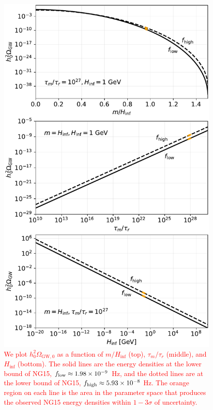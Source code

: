 \documentclass[prd,twocolumn,aps,psfig,nofootinbib,nobibnotes,superscriptaddress,preprintnumbers,times]{revtex4-2}
\def\red{\textcolor{red}}
\begin{document}
\begin{figure}
\includegraphics[width=\linewidth]{fig2.pdf}
\caption{\red{We plot $h_0^2\Omega_{\text{GW},0}$ as a function of $m/H_{\inf}$ (top), $\tau_m/\tau_r$ (middle), and $H_{\inf}$ (bottom). The solid lines are the energy densities at the lower bound of NG15, $f_{\rm low} \approx 1.98\times 10^{-9}$ Hz, and the dotted lines are at the lower bound of NG15, $f_{\rm high} \approx 5.93\times 10^{-8}$ Hz. The orange region on each line is the area in the parameter space that produces the observed NG15 energy densities within $1-3\sigma$ of uncertainty.}}
\label{fig:contours}
\end{figure}
\end{document}
